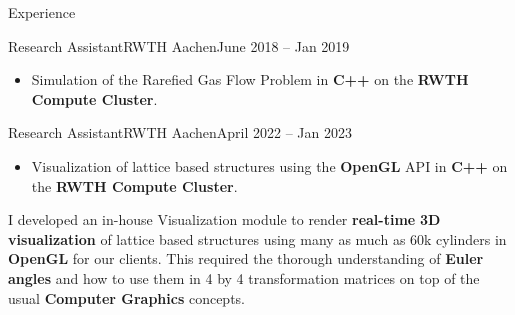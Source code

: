 \begin{cvsection}{Experience}

		\begin{cvsubsection}{Research Assistant}{RWTH Aachen}{June 2018 -- Jan 2019}
		\begin{itemize}
			\item Simulation of the Rarefied Gas Flow Problem in \textbf{C++} on the \textbf{RWTH Compute Cluster}.
		\end{itemize}
	\end{cvsubsection}
		\begin{cvsubsection}{Research Assistant}{RWTH Aachen}{April 2022 -- Jan 2023}
		\begin{itemize}
			\item Visualization of lattice based structures using the \textbf{OpenGL} API in \textbf{C++} on the \textbf{RWTH Compute Cluster}.
		\end{itemize}
		I developed an in-house Visualization module to render \textbf{real-time} \textbf{3D visualization} of lattice based structures using many as much as 60k cylinders in \textbf{OpenGL} for our clients.
		This required the thorough understanding of \textbf{Euler angles} and how to use them in 4 by 4 transformation matrices on top of the usual \textbf{Computer Graphics} concepts.
	\end{cvsubsection}


\end{cvsection}
